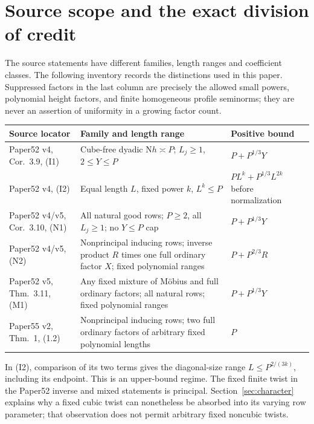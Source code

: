 \documentclass[11pt]{article}
\theoremstyle{remark}\newtheorem{remark}[theorem]{Remark}
\newcommand{\N}{\mathrm N}
\begin{document}
\section{Source scope and the exact division of credit}\label{sec:source}

The source statements have different families, length ranges and coefficient classes. The following inventory records the distinctions used in this paper. Suppressed factors in the last column are precisely the allowed small powers, polynomial height factors, and finite homogeneous profile seminorms; they are never an assertion of uniformity in a growing factor count.

\begin{center}\small
\begin{tabular}{@{}p{}p{}p{}@{}}
\toprule
Source locator & Family and length range & Positive bound\\\midrule
Paper52 v4, Cor.~3.9, (I1) & Cube-free dyadic $\N h\asymp P$; $L_j\ge1$, $2\le Y\le P$ & $P+P^{1/3}Y$\\[4pt]
Paper52 v4, (I2) & Equal length $L$, fixed power $k$, $L^k\le P$ & $PL^k+P^{1/3}L^{2k}$ before normalization\\[4pt]
Paper52 v4/v5, Cor.~3.10, (N1) & All natural good rows; $P\ge2$, all $L_j\ge1$; no $Y\le P$ cap & $P+P^{1/3}Y$\\[4pt]
Paper52 v4/v5, (N2) & Nonprincipal inducing rows; inverse product $R$ times one full ordinary factor $X$; fixed polynomial ranges & $P+P^{2/3}R$\\[4pt]
Paper52 v5, Thm.~3.11, (M1) & Any fixed mixture of M\"obius and full ordinary factors; all natural rows; fixed polynomial ranges & $P+P^{1/3}Y$\\[4pt]
Paper55 v2, Thm.~1, (1.2) & Nonprincipal inducing rows; two full ordinary factors of arbitrary fixed polynomial lengths & $P$\\
\bottomrule
\end{tabular}
\end{center}

In (I2), comparison of its two terms gives the diagonal-size range $L\le P^{2/(3k)}$, including its endpoint. This is an upper-bound regime. The fixed finite twist in the Paper52 inverse and mixed statements is principal. Section~\ref{sec:character} explains why a fixed cubic twist can nonetheless be absorbed into its varying row parameter; that observation does not permit arbitrary fixed noncubic twists.
\end{document}
